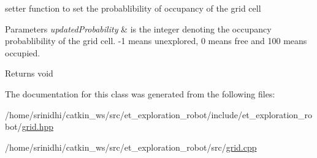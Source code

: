 setter function to set the probablibility of occupancy of the grid cell 


\begin{DoxyParams}{Parameters}
{\em updated\+Probability} & is the integer denoting the occupancy probablibility of the grid cell. -\/1 means unexplored, 0 means free and 100 means occupied.\\
\hline
\end{DoxyParams}
\begin{DoxyReturn}{Returns}
void 
\end{DoxyReturn}


The documentation for this class was generated from the following files\+:\begin{DoxyCompactItemize}
\item 
/home/srinidhi/catkin\+\_\+ws/src/et\+\_\+exploration\+\_\+robot/include/et\+\_\+exploration\+\_\+robot/\hyperlink{grid_8hpp}{grid.\+hpp}\item 
/home/srinidhi/catkin\+\_\+ws/src/et\+\_\+exploration\+\_\+robot/src/\hyperlink{grid_8cpp}{grid.\+cpp}\end{DoxyCompactItemize}
